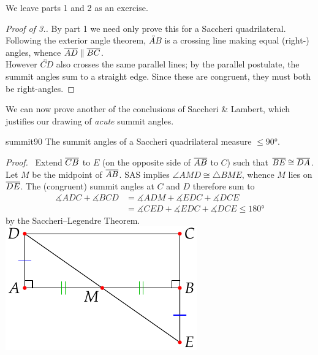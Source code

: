 We leave parts 1 and 2 as an exercise.

\begin{proof}[Proof of 3.]
By part 1 we need only prove this for a Saccheri quadrilateral.
Following the exterior angle theorem, $\overleftrightarrow{AB}$ is a crossing line making equal (right-) angles, whence $\overline{AD}\parallel\overline{BC}$.\\[4pt]
However $\overleftrightarrow{CD}$ also crosses the same parallel lines; by the parallel postulate, the summit angles sum to a straight edge. Since these are congruent, they must both be right-angles. 
\end{proof}

We can now prove another of the conclusions of Saccheri \& Lambert, which justifies our drawing of \emph{acute} summit angles.

\begin{thm}{}{summit90}
The summit angles of a Saccheri quadrilateral measure $\le \ang{90}$. 
\end{thm}

\begin{tcolorbox}[proofstyle, lower separated=false, sidebyside, sidebyside align=top seam, sidebyside gap=0pt, righthand width=0.34\linewidth]
\emph{Proof.} \ Extend $\overline{CB}$ to $E$ (on the opposite side of $\overline{AB}$ to $C$) such that $\overline{BE}\cong\overline{DA}$. Let $M$ be the midpoint of $\overline{AB}$.\smallbreak
SAS implies $\angle AMD\cong \triangle BME$, whence $M$ lies on $\overline{DE}$.\smallbreak
The (congruent) summit angles at $C$ and $D$ therefore sum to
\begin{align*}
\measuredangle ADC+\measuredangle BCD&=\measuredangle ADM+\measuredangle EDC+\measuredangle DCE\\
&=\measuredangle CED+\measuredangle EDC+\measuredangle DCE \le \ang{180}
\end{align*}
by the Saccheri--Legendre Theorem.
\tcblower
\flushright\includegraphics[scale=0.9]{history-quad2}\\[10pt]
\hfill\qedsymbol
\end{tcolorbox}





